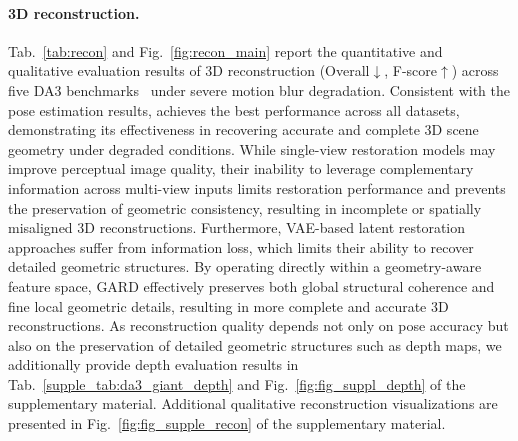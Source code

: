 \paragraph{3D reconstruction.}
Tab.~\ref{tab:recon} and Fig.~\ref{fig:recon_main} report the quantitative and qualitative evaluation results of 3D reconstruction (Overall$\downarrow$, F-score$\uparrow$) across five DA3 benchmarks~\cite{depthanything3} under severe motion blur degradation. Consistent with the pose estimation results, \ourmodel{} achieves the best performance across all datasets, demonstrating its effectiveness in recovering accurate and complete 3D scene geometry under degraded conditions. While single-view restoration models may improve perceptual image quality, their inability to leverage complementary information across multi-view inputs limits restoration performance and prevents the preservation of geometric consistency, resulting in incomplete or spatially misaligned 3D reconstructions. Furthermore, VAE-based latent restoration approaches suffer from information loss, which limits their ability to recover detailed geometric structures. By operating directly within a geometry-aware feature space, GARD effectively preserves both global structural coherence and fine local geometric details, resulting in more complete and accurate 3D reconstructions. As reconstruction quality depends not only on pose accuracy but also on the preservation of detailed geometric structures such as depth maps, we additionally provide depth evaluation results in Tab.~\ref{supple_tab:da3_giant_depth} and Fig.~\ref{fig:fig_suppl_depth} of the supplementary material. Additional qualitative reconstruction visualizations are presented in Fig.~\ref{fig:fig_supple_recon} of the supplementary material.


